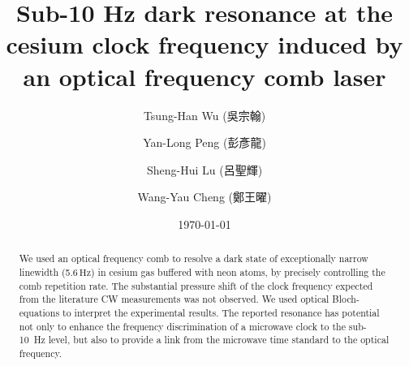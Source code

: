 \documentclass[%
aps,
prl,
showpacs,
twocolumn,
]{revtex4}
\newcommand{\unit}[1]{\ensuremath{\, \mathrm{#1}}}
\begin{document}
\begin{CJK*}{UTF8}{}

\title{Sub-10 Hz dark resonance at the cesium clock frequency induced by an optical frequency comb laser}


\author{Tsung-Han Wu (吳宗翰)}
\author{Yan-Long Peng (彭彥龍)}
\author{Sheng-Hui Lu (呂聖輝)}
\author{Wang-Yau Cheng (鄭王曜)}


\date{\today}

\begin{abstract}
We used an optical frequency comb to resolve a dark state of
exceptionally narrow linewidth (5.6\unit{Hz}) in cesium gas buffered
with neon atoms, by precisely controlling the comb repetition rate.
The substantial pressure shift of the clock frequency expected
from the literature CW measurements was not observed. We
used optical Bloch-equations to interpret the experimental results. The
reported resonance has potential not only to enhance the
frequency discrimination of a microwave clock to the sub-10~Hz level,
but also to provide a link from the microwave time standard to the
optical frequency.
\end{abstract}


\maketitle
\end{CJK*}
\end{document}
